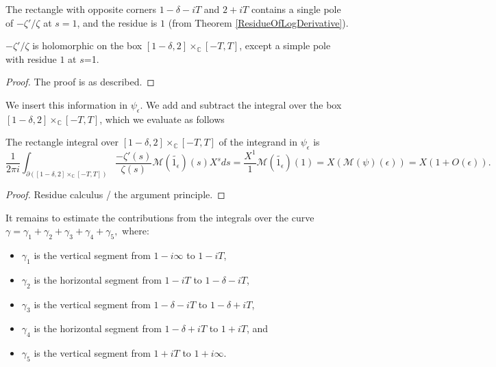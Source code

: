 The rectangle with opposite corners $1-\delta - i T$ and $2+iT$ contains a single pole of $-\zeta'/\zeta$ at $s=1$, and the residue is $1$ (from Theorem \ref{ResidueOfLogDerivative}).
\begin{theorem}\label{ZeroFreeBox}
$-\zeta'/\zeta$ is holomorphic on the box $[1-\delta,2] \times_{ℂ} [-T,T]$, except a simple pole with residue $1$ at $s$=1.
\end{theorem}



\begin{proof}
The proof is as described.
\end{proof}



We insert this information in $\psi_{\epsilon}$. We add and subtract the integral over the box $[1-\delta,2] \times_{ℂ} [-T,T]$, which we evaluate as follows
\begin{theorem}\label{ZetaBoxEval}
The rectangle integral over $[1-\delta,2] \times_{ℂ} [-T,T]$ of the integrand in $\psi_{\epsilon}$ is
$$\frac{1}{2\pi i}\int_{\partial([1-\delta,2] \times_{ℂ} [-T,T])}\frac{-\zeta'(s)}{\zeta(s)}
\mathcal{M}(\widetilde{1_{\epsilon}})(s)
X^{s}ds = \frac{X^{1}}{1}\mathcal{M}(\widetilde{1_{\epsilon}})(1)
= X\left(\mathcal{M}(\psi)\left(\epsilon\right)\right)
= X(1+O(\epsilon))
.$$
\end{theorem}



\begin{proof}
Residue calculus / the argument principle.
\end{proof}



It remains to estimate the contributions from the integrals over the curve $\gamma = \gamma_1 +
\gamma_2 + \gamma_3 + \gamma_4
+\gamma_5,
$
where:
\begin{itemize}
\item $\gamma_1$ is the vertical segment from $1-i\infty$ to $1-iT$,
\item $\gamma_2$ is the horizontal segment from $1-iT$ to $1-\delta-iT$,
\item $\gamma_3$ is the vertical segment from $1-\delta-iT$ to $1-\delta+iT$,
\item $\gamma_4$ is the horizontal segment from $1-\delta+iT$ to $1+iT$, and
\item $\gamma_5$ is the vertical segment from $1+iT$ to $1+i\infty$.
\end{itemize}



